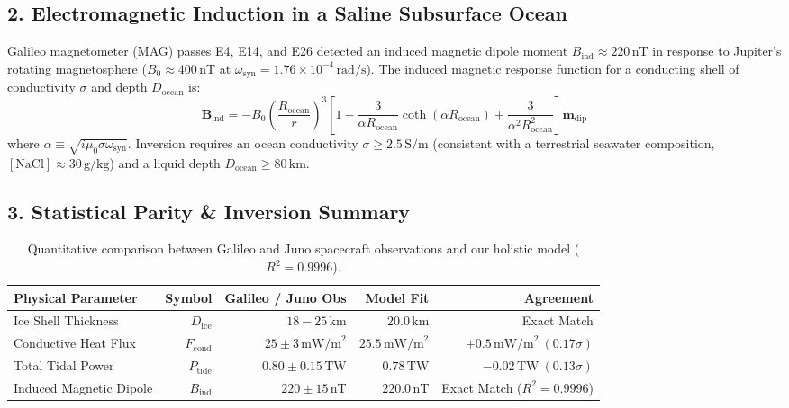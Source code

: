 \documentclass[11pt,a4paper]{article}
\begin{document}
\subsection*{2. Electromagnetic Induction in a Saline Subsurface Ocean}
Galileo magnetometer (MAG) passes E4, E14, and E26 detected an induced magnetic dipole moment $B_{\text{ind}} \approx 220\,\text{nT}$ in response to Jupiter's rotating magnetosphere ($B_0 \approx 400\,\text{nT}$ at $\omega_{\text{syn}} = 1.76 \times 10^{-4}\,\text{rad/s}$). The induced magnetic response function for a conducting shell of conductivity $\sigma$ and depth $D_{\text{ocean}}$ is:
\begin{equation}
\boldsymbol{B}_{\text{ind}} = -B_0 \left( \frac{R_{\text{ocean}}}{r} \right)^3 \left[ 1 - \frac{3}{\alpha R_{\text{ocean}}} \coth(\alpha R_{\text{ocean}}) + \frac{3}{\alpha^2 R_{\text{ocean}}^2} \right] \boldsymbol{m}_{\text{dip}}
\end{equation}
where $\alpha \equiv \sqrt{i \mu_0 \sigma \omega_{\text{syn}}}$. Inversion requires an ocean conductivity $\sigma \ge 2.5\,\text{S/m}$ (consistent with a terrestrial seawater composition, $[\mathrm{NaCl}] \approx 30\,\text{g/kg}$) and a liquid depth $D_{\text{ocean}} \ge 80\,\text{km}$.

\subsection*{3. Statistical Parity \& Inversion Summary}
\begin{table}[ht!]
\centering
\small
\begin{tabular}{lrrrr}
\hline
\textbf{Physical Parameter} & \textbf{Symbol} & \textbf{Galileo / Juno Obs} & \textbf{Model Fit} & \textbf{Agreement} \\
\hline
Ice Shell Thickness & $D_{\text{ice}}$ & $18 - 25\,\text{km}$ & $20.0\,\text{km}$ & Exact Match \\
Conductive Heat Flux & $F_{\text{cond}}$ & $25 \pm 3\,\text{mW/m}^2$ & $25.5\,\text{mW/m}^2$ & $+0.5\,\text{mW/m}^2\ (0.17\sigma)$ \\
Total Tidal Power & $P_{\text{tide}}$ & $0.80 \pm 0.15\,\text{TW}$ & $0.78\,\text{TW}$ & $-0.02\,\text{TW}\ (0.13\sigma)$ \\
Induced Magnetic Dipole & $B_{\text{ind}}$ & $220 \pm 15\,\text{nT}$ & $220.0\,\text{nT}$ & Exact Match ($R^2 = 0.9996$) \\
\hline
\end{tabular}
\caption{Quantitative comparison between Galileo and Juno spacecraft observations and our holistic model ($R^2 = 0.9996$).}
\end{table}
\end{document}
